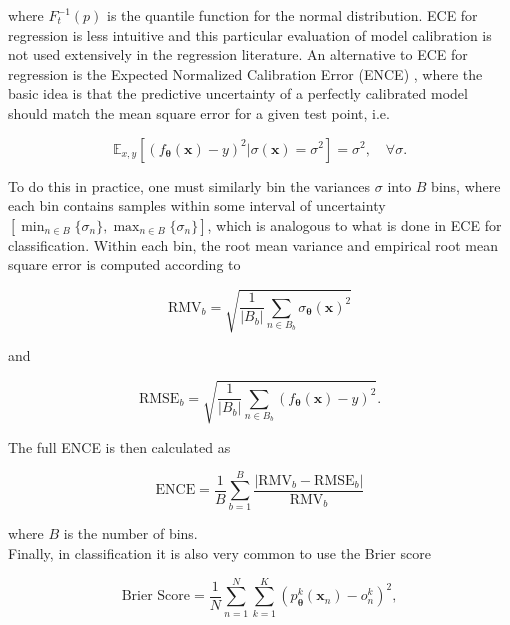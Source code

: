 \noindent where $F_t^{-1}(p)$ is the quantile function for the normal distribution. ECE for regression is less intuitive and this particular evaluation of model calibration is not used extensively in the regression literature. An alternative to ECE for regression is the Expected Normalized Calibration Error (ENCE) \citep{levi2020evaluatingcalibratinguncertaintyprediction}, where the basic idea is that the predictive uncertainty of a perfectly calibrated model should match the mean square error for a given test point, i.e.

\begin{equation}
    \mathbb{E}_{x,y}\left[(f_{\bm{\theta}}(\mathbf{x})-y)^2|\sigma(\mathbf{x})=\sigma^2\right] = \sigma^2, \quad \forall \sigma.
\end{equation}

\noindent To do this in practice, one must similarly bin the variances $\sigma$ into $B$ bins, where each bin contains samples within some interval of uncertainty
$[\min_{n\in B}\{\sigma_n\},\max_{n\in B}\{\sigma_n\}]$, which is analogous to what is done in ECE for classification. Within each bin, the root mean variance and empirical root mean square error is computed according to

\begin{equation}
    \text{RMV}_b = \sqrt{\frac{1}{|B_b|}\sum_{n\in B_b}\sigma_{\bm{\theta}}(\mathbf{x})^2}
\end{equation}

\noindent and 

\begin{equation}
    \text{RMSE}_b = \sqrt{\frac{1}{|B_b|}\sum_{n\in B_b}(f_{\bm{\theta}}(\mathbf{x})-y)^2}.
\end{equation}

\noindent The full ENCE is then calculated as

\begin{equation}
    \text{ENCE} = \frac{1}{B}\sum^B_{b=1}\frac{|\text{RMV}_b-\text{RMSE}_b|}{\text{RMV}_b}
\end{equation}

\noindent where $B$ is the number of bins. \\

\noindent Finally, in classification it is also very common to use the Brier score \citep{VERIFICATIONOFFORECASTSEXPRESSEDINTERMSOFPROBABILITY}

\begin{equation}
    \text{Brier Score} = \frac{1}{N}\sum^N_{n=1}\sum^K_{k=1}(p^k_{\bm{\theta}}(\mathbf{x}_{n})-o_n^k)^2,
\end{equation}

